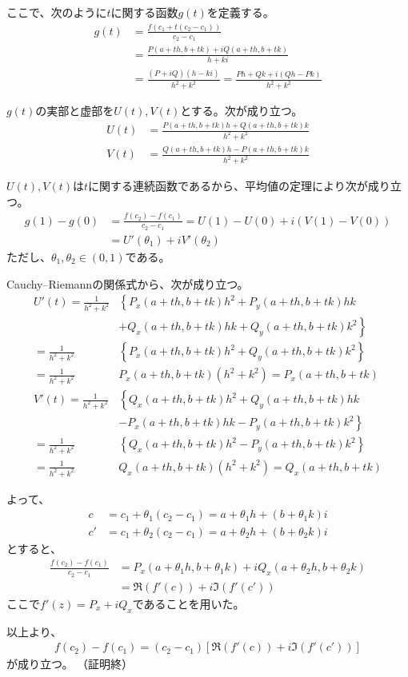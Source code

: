 ここで、次のように$t$に関する函数$g(t)$を定義する。
\begin{align*}
    g(t)&=\frac{f(c_1+t(c_2-c_1))}{c_2-c_1}\\
    &=\frac{P(a+th,b+tk)+iQ(a+th,b+tk)}{h+ki}\\
    &=\frac{(P+iQ)(h-ki)}{h^2+k^2}=\frac{Ph+Qk+i(Qh-Pk)}{h^2+k^2}
\end{align*}

$g(t)$の実部と虚部を$U(t),V(t)$とする。次が成り立つ。
\begin{align*}
    U(t)&=\frac{P(a+th,b+tk)h+Q(a+th,b+tk)k}{h^2+k^2}\\
    V(t)&=\frac{Q(a+th,b+tk)h-P(a+th,b+tk)k}{h^2+k^2}
\end{align*}

$U(t),V(t)$は$t$に関する連続函数であるから、平均値の定理により次が成り立つ。
\begin{align*}
    g(1)-g(0)&=\frac{f(c_2)-f(c_1)}{c_2-c_1}=U(1)-U(0)+i(V(1)-V(0))\\
    &=U'(\theta_1)+iV'(\theta_2)
\end{align*}
ただし、$\theta_1,\theta_2\in(0,1)$である。

Cauchy--Riemannの関係式から、次が成り立つ。
\begin{align*}
    U'(t)=\frac{1}{h^2+k^2}
    &\left\{P_x(a+th,b+tk)h^2+P_y(a+th,b+tk)hk\right.\\
    &\left.+Q_x(a+th,b+tk)hk+Q_y(a+th,b+tk)k^2\right\}\\
    =\frac{1}{h^2+k^2}
    &\left\{P_x(a+th,b+tk)h^2
    +Q_y(a+th,b+tk)k^2\right\}\\
    =\frac{1}{h^2+k^2}
    &P_x(a+th,b+tk)(h^2+k^2)=P_x(a+th,b+tk)\\
    V'(t)=\frac{1}{h^2+k^2}
    &\left\{Q_x(a+th,b+tk)h^2+Q_y(a+th,b+tk)hk\right.\\
    &\left.-P_x(a+th,b+tk)hk-P_y(a+th,b+tk)k^2\right\}\\
    =\frac{1}{h^2+k^2}
    &\left\{Q_x(a+th,b+tk)h^2
    -P_y(a+th,b+tk)k^2\right\}\\
    =\frac{1}{h^2+k^2}
    &Q_x(a+th,b+tk)(h^2+k^2)=Q_x(a+th,b+tk)
\end{align*}

よって、
\begin{align*}
    c&=c_1+\theta_1(c_2-c_1)=a+\theta_1 h+(b+\theta_1 k)i\\
    c'&=c_1+\theta_2(c_2-c_1)=a+\theta_2 h+(b+\theta_2 k)i
\end{align*}
とすると、
\begin{align*}
    \frac{f(c_2)-f(c_1)}{c_2-c_1}
    &=P_x(a+\theta_1 h,b+\theta_1 k)+iQ_x(a+\theta_2 h,b+\theta_2 k)\\
    &=\Re(f'(c))+i\Im(f'(c'))
\end{align*}
ここで$f'(z)=P_x+iQ_x$であることを用いた。

以上より、
\begin{align*}
    f(c_2)-f(c_1)=(c_2-c_1)[\Re(f'(c))+i\Im(f'(c'))]
\end{align*}
が成り立つ。
（証明終）